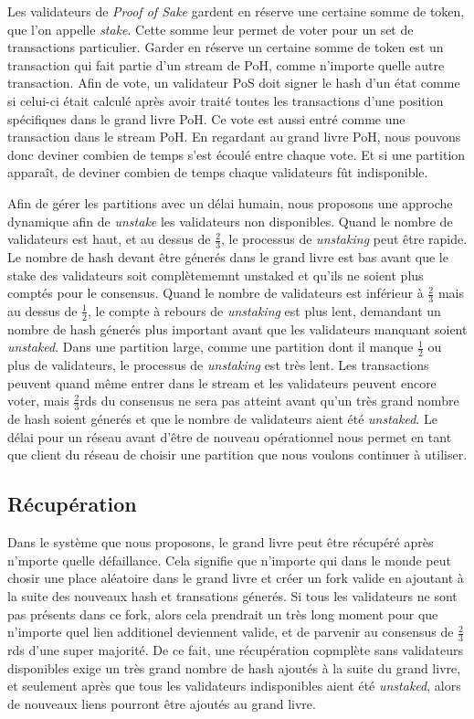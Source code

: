 \documentclass[12pt]{article}
\begin{document}
Les validateurs de \textit{Proof of Sake} gardent en réserve une certaine somme de token, que l'on appelle \textit{stake}. Cette somme leur permet de voter pour un set de transactions particulier. Garder en réserve un certaine somme de token est un transaction qui fait partie d'un stream de PoH, comme n'importe quelle autre transaction. Afin de vote, un validateur PoS doit signer le hash d'un état comme si celui-ci était calculé après avoir traité toutes les transactions d'une position spécifiques dans le grand livre PoH. Ce vote est aussi entré comme une transaction dans le stream PoH. En regardant au grand livre PoH, nous pouvons donc deviner combien de temps s'est écoulé entre chaque vote. Et si une partition apparaît, de deviner combien de temps chaque validateurs fût indisponible.

Afin de gérer les partitions avec un délai humain, nous proposons une approche dynamique afin de \textit{unstake} les validateurs non disponibles. Quand le nombre de validateurs est haut, et au dessus de \(\frac{2}{3}\), le processus de \textit{unstaking} peut être rapide. Le nombre de hash devant être génerés dans le grand livre est bas avant que le stake des validateurs soit complètememnt unstaked et qu'ils ne soient plus comptés pour le consensus. Quand le nombre de validateurs est inférieur à \(\frac{2}{3}\) mais au dessus de  \(\frac{1}{2}\), le compte à rebours de \textit{unstaking} est plus lent, demandant un nombre de hash génerés plus important avant que les validateurs manquant soient \textit{unstaked}. Dans une partition large, comme une partition dont il manque \(\frac{1}{2}\) ou plus de validateurs, le processus de \textit{unstaking} est très lent. Les transactions peuvent quand même entrer dans le stream et les validateurs peuvent encore voter, mais \(\frac{2}{3}\)rds du consensus ne sera pas atteint avant qu'un très grand nombre de hash soient génerés et que le nombre de validateurs aient été \textit{unstaked}. Le délai pour un réseau avant d'être de nouveau opérationnel nous permet en tant que client du réseau de choisir une partition que nous voulons continuer à utiliser.

\subsection{Récupération}\label{disponibility}
Dans le système que nous proposons, le grand livre peut être récupéré après n'mporte quelle défaillance. Cela signifie que n'importe qui dans le monde peut chosir une place aléatoire dans le grand livre et créer un fork valide en ajoutant à la suite des nouveaux hash et transations génerés. Si tous les validateurs ne sont pas présents dans ce fork, alors cela prendrait un très long moment pour que n'importe quel lien additionel deviennent valide, et de parvenir au consensus de \(\frac{2}{3}\)rds d'une super majorité. De ce fait, une récupération copmplète sans validateurs disponibles exige un très grand nombre de hash ajoutés à la suite du grand livre, et seulement après que tous les validateurs indisponibles aient été \textit{unstaked}, alors de nouveaux liens pourront être ajoutés au grand livre.
\end{document}
